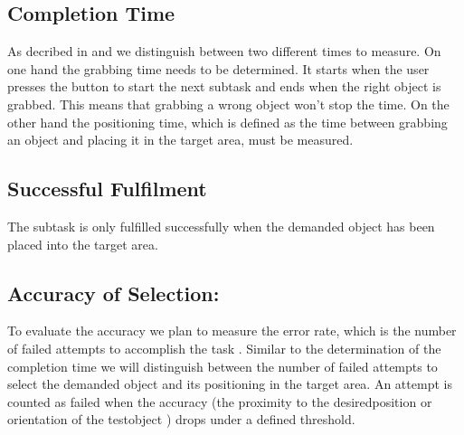\documentclass[a4paper, 12pt]{article}
\begin{document}
\subsection{Completion Time}
As decribed in \cite{poupyrev1997framework} and \cite{bowman1997evaluation} we distinguish between two different times to measure. On one hand the grabbing time needs to be determined. It starts when the user presses the button to start the next subtask and ends when the right object is grabbed. This means that grabbing a wrong object won't stop the time. On the other hand the positioning time, which is defined as the time between grabbing an object and placing it in the target area, must be measured. 


\subsection{Successful Fulfilment}
The subtask is only fulfilled successfully when the demanded object has been placed into the target area. 

\subsection{Accuracy of Selection: }
To evaluate the accuracy we plan to measure the error rate, which is \glqq the number of failed attempts to accomplish the task\grqq{} \cite{poupyrev1997framework}. Similar to the determination of the completion time we will distinguish between the number of failed attempts to select the demanded object and its positioning in the target area. An attempt is counted as failed when the accuracy (\glqq the proximity to the desiredposition or orientation of the testobject\grqq{} \cite{poupyrev1997framework}) drops under a defined threshold. 










\renewcommand{\refname}{References}

\end{document}
